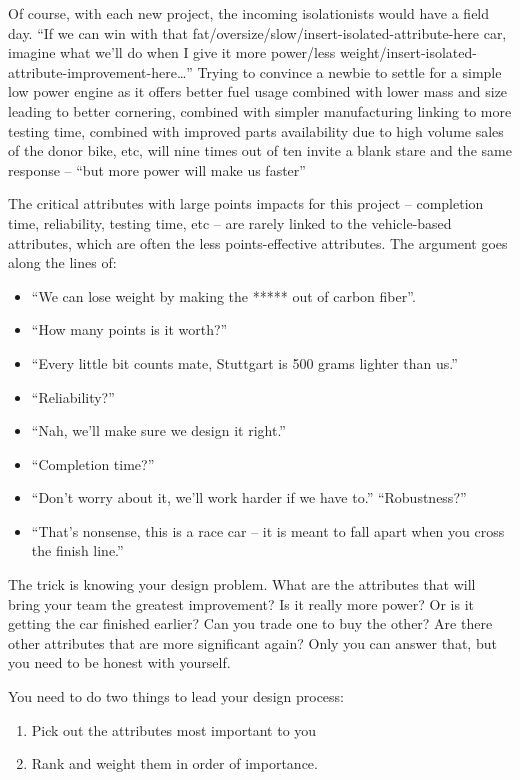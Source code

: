 \documentclass[10pt, a4paper, article, oneside, twocolumn, final]{memoir}
\begin{document}
Of course, with each new project, the incoming isolationists would have a field day. “If we can win with that fat/\allowbreak oversize/\allowbreak slow/\allowbreak insert-isolated-attribute-here car, imagine what we’ll do when I give it more power/\allowbreak less weight/\allowbreak insert-isolated-attribute-improvement-here\ldots” Trying to convince a newbie to settle for a simple low power engine as it offers better fuel usage combined with lower mass and size leading to better cornering, combined with simpler manufacturing linking to more testing time, combined with improved parts availability due to high volume sales of the donor bike, etc, will nine times out of ten invite a blank stare and the same response -- “but more power will make us faster” 

The critical attributes with large points impacts for this project -- completion time, reliability, testing time, etc -- are rarely linked to the vehicle-based attributes, which are often the less points-effective attributes. The argument goes along the lines of: 

\begin{itemize}
    \item “We can lose weight by making the ***** out of carbon fiber”. 
    \item “How many points is it worth?” 
    \item “Every little bit counts mate, Stuttgart is \num{500} grams lighter than us.” 
    \item “Reliability?” 
    \item “Nah, we’ll make sure we design it right.” 
    \item “Completion time?” 
    \item “Don’t worry about it, we’ll work harder if we have to.” “Robustness?” 
    \item “That’s nonsense, this is a race car -- it is meant to fall apart when you cross the finish line.” 
\end{itemize}

The trick is knowing your design problem. What are the attributes that will bring your team the greatest improvement? Is it really more power? Or is it getting the car finished earlier? Can you trade one to buy the other? Are there other attributes that are more significant again? Only you can answer that, but you need to be honest with yourself. 

You need to do two things to lead your design process:

\begin{enumerate}
    \item Pick out the attributes most important to you 
    \item Rank and weight them in order of importance. 
\end{enumerate}
\end{document}
